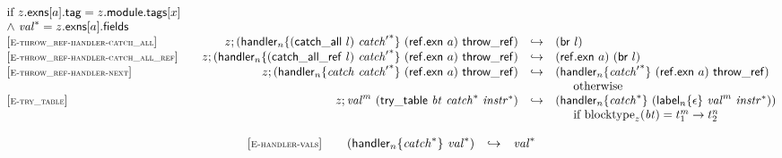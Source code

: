 $$\begin{array}[t]{@{}lrcl@{}l@{}}
{\begin{array}[t]{@{}l@{}}
\mbox{if}~ z{.}\mathsf{exns}{}[a]{.}\mathsf{tag} = z{.}\mathsf{module}{.}\mathsf{tags}{}[x] \\
{\land}~ {{\mathit{val}}^\ast} = z{.}\mathsf{exns}{}[a]{.}\mathsf{fields} \\
\end{array}
} \\
{[\textsc{\scriptsize E{-}throw\_ref{-}handler{-}catch\_all}]} \quad & z ; ({{\mathsf{handler}}_{n}}{\{ (\mathsf{catch\_all}~l)~{{\mathit{catch}'}^\ast} \}}~(\mathsf{ref{.}exn}~a)~\mathsf{throw\_ref}) & \hookrightarrow & (\mathsf{br}~l) \\
{[\textsc{\scriptsize E{-}throw\_ref{-}handler{-}catch\_all\_ref}]} \quad & z ; ({{\mathsf{handler}}_{n}}{\{ (\mathsf{catch\_all\_ref}~l)~{{\mathit{catch}'}^\ast} \}}~(\mathsf{ref{.}exn}~a)~\mathsf{throw\_ref}) & \hookrightarrow & (\mathsf{ref{.}exn}~a)~(\mathsf{br}~l) \\
{[\textsc{\scriptsize E{-}throw\_ref{-}handler{-}next}]} \quad & z ; ({{\mathsf{handler}}_{n}}{\{ {\mathit{catch}}~{{\mathit{catch}'}^\ast} \}}~(\mathsf{ref{.}exn}~a)~\mathsf{throw\_ref}) & \hookrightarrow & ({{\mathsf{handler}}_{n}}{\{ {{\mathit{catch}'}^\ast} \}}~(\mathsf{ref{.}exn}~a)~\mathsf{throw\_ref}) &  \\
&&& \multicolumn{2}{@{}l@{}}{\quad
\quad \mbox{otherwise}
} \\
{[\textsc{\scriptsize E{-}try\_table}]} \quad & z ; {{\mathit{val}}^{m}}~(\mathsf{try\_table}~{\mathit{bt}}~{{\mathit{catch}}^\ast}~{{\mathit{instr}}^\ast}) & \hookrightarrow & ({{\mathsf{handler}}_{n}}{\{ {{\mathit{catch}}^\ast} \}}~({{\mathsf{label}}_{n}}{\{ \epsilon \}}~{{\mathit{val}}^{m}}~{{\mathit{instr}}^\ast})) &  \\
&&& \multicolumn{2}{@{}l@{}}{\quad
\quad \mbox{if}~ {{\mathrm{blocktype}}}_{z}({\mathit{bt}}) = {t_1^{m}} \rightarrow {t_2^{n}}
} \\
\end{array}
$$

\vspace{1ex}

$$
\begin{array}[t]{@{}lrcl@{}l@{}}
{[\textsc{\scriptsize E{-}handler{-}vals}]} \quad & ({{\mathsf{handler}}_{n}}{\{ {{\mathit{catch}}^\ast} \}}~{{\mathit{val}}^\ast}) & \hookrightarrow & {{\mathit{val}}^\ast} \\
\end{array}
$$

\vspace{1ex}

